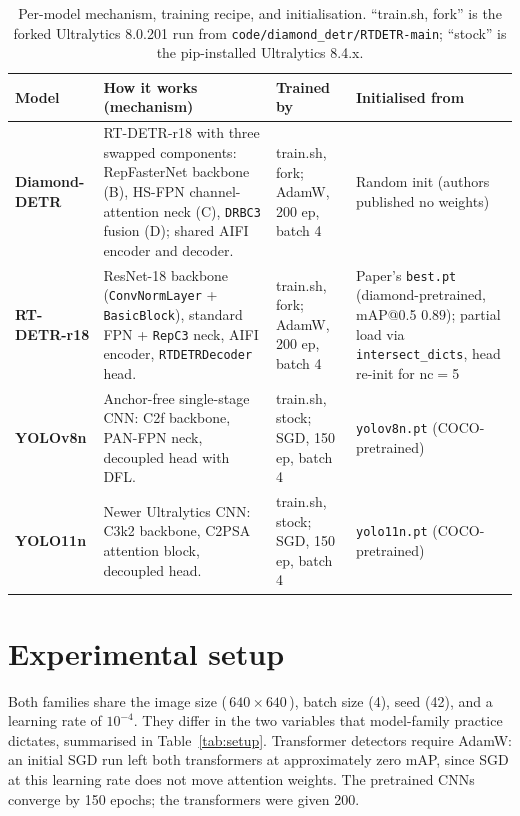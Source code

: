 \documentclass[11pt,a4paper]{article}
\begin{document}
\begin{table}[H]
\centering
\caption{Per-model mechanism, training recipe, and initialisation. ``train.sh, fork'' is the
forked Ultralytics 8.0.201 run from \texttt{code/diamond\_detr/RTDETR-main}; ``stock'' is the
pip-installed Ultralytics 8.4.x.}
\label{tab:provenance}
\small
\renewcommand{\arraystretch}{1.25}
\begin{tabularx}{\textwidth}{>{\bfseries}l X p{2.5cm} X}
\toprule
\textnormal{\textbf{Model}} & \textbf{How it works (mechanism)} & \textbf{Trained by} & \textbf{Initialised from} \\
\midrule
Diamond-DETR & RT-DETR-r18 with three swapped components: RepFasterNet backbone (B),
HS-FPN channel-attention neck (C), \texttt{DRBC3} fusion (D); shared AIFI encoder and decoder. &
train.sh, fork; AdamW, 200 ep, batch 4 & Random init (authors published no weights) \\
RT-DETR-r18 & ResNet-18 backbone (\texttt{ConvNormLayer} + \texttt{BasicBlock}), standard
FPN + \texttt{RepC3} neck, AIFI encoder, \texttt{RTDETRDecoder} head. &
train.sh, fork; AdamW, 200 ep, batch 4 & Paper's \texttt{best.pt} (diamond-pretrained, mAP@0.5
$0.89$); partial load via \texttt{intersect\_dicts}, head re-init for nc$=$5 \\
YOLOv8n & Anchor-free single-stage CNN: C2f backbone, PAN-FPN neck, decoupled head with DFL. &
train.sh, stock; SGD, 150 ep, batch 4 & \texttt{yolov8n.pt} (COCO-pretrained) \\
YOLO11n & Newer Ultralytics CNN: C3k2 backbone, C2PSA attention block, decoupled head. &
train.sh, stock; SGD, 150 ep, batch 4 & \texttt{yolo11n.pt} (COCO-pretrained) \\
\bottomrule
\end{tabularx}
\end{table}

\section{Experimental setup}
Both families share the image size (\,$640\times640$\,), batch size (4), seed (42), and a learning
rate of $10^{-4}$. They differ in the two variables that model-family practice dictates, summarised
in Table~\ref{tab:setup}. Transformer detectors require AdamW: an initial SGD run left both
transformers at approximately zero mAP, since SGD at this learning rate does not move attention
weights. The pretrained CNNs converge by 150 epochs; the transformers were given 200.
\end{document}
